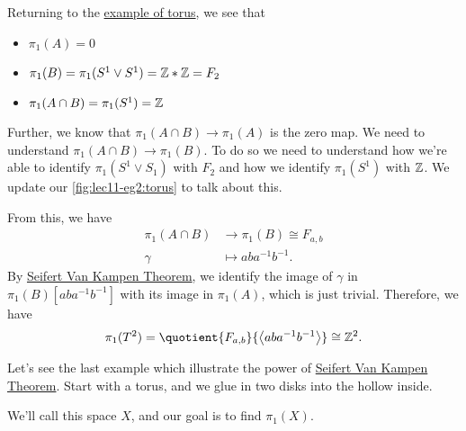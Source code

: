 \begin{explanation}
	Returning to the \hyperref[lec11:eg:torus]{example of torus}, we see that
	\begin{itemize}
		\item \(\pi _1(A) = 0\)
		\item \(\pi _1(B) = \pi _1(S^1\vee S^1) = \mathbb{\MakeUppercase{z}} \ast \mathbb{\MakeUppercase{z}}  = F_2\)
		\item \(\pi _1(A\cap B) = \pi _1(S^1) = \mathbb{\MakeUppercase{z}} \)
	\end{itemize}

	Further, we know that \(\pi _1(A\cap B)\to \pi _1(A)\) is the zero map. We need to understand \(\pi_1(A\cap B)\to \pi _1(B)\). To do so we
	need to understand how we're able to identify \(\pi _1(S^1\vee S_1)\) with \(F_2\) and how we identify \(\pi _1(S^1)\) with \(\mathbb{\MakeUppercase{z}} \).
	We update our \autoref{fig:lec11-eg2:torus} to talk about this.
	\begin{figure}[H]
		\centering
		\label{fig:lec11-eg2:torus-ver2}
	\end{figure}
	From this, we have
	\[
		\begin{split}
			\pi _1(A\cap B) &\to \pi _1(B)\cong F_{a, b}\\
			\gamma &\mapsto aba^{-1} b^{-1}.
		\end{split}
	\]
	By \hyperref[thm:Seifert-Van-Kampen-Theorem]{Seifert Van Kampen Theorem}, we identify the image of \(\gamma \) in \(\pi _1(B)[aba^{-1} b^{-1} ]\) with
	its image in \(\pi _1(A)\), which is just trivial. Therefore, we have
	\[
		\pi _1(T^2) = \quotient{F_{a, b}}{\left< aba^{-1} b^{-1}  \right> } \cong \mathbb{\MakeUppercase{z}} ^2.
	\]
\end{explanation}
\begin{eg}
	Let's see the last example which illustrate the power of \hyperref[thm:Seifert-Van-Kampen-Theorem]{Seifert Van Kampen Theorem}. Start with a torus, and
	we glue in two disks into the hollow inside.
	\begin{figure}[H]
		\centering
		\label{fig:lec11:eg-3:1}
	\end{figure}
	We'll call this space \(X\), and our goal is to find \(\pi_1(X)\).
\end{eg}
